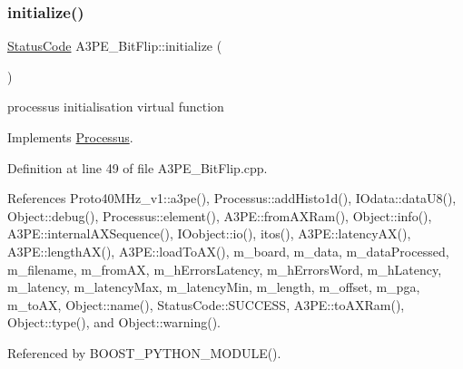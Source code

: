 \subsubsection{\texorpdfstring{initialize()}{initialize()}}
{\footnotesize\ttfamily \hyperlink{classStatusCode}{Status\+Code} A3\+P\+E\+\_\+\+Bit\+Flip\+::initialize (\begin{DoxyParamCaption}{ }\end{DoxyParamCaption})\hspace{0.3cm}{\ttfamily [virtual]}}

processus initialisation virtual function 

Implements \hyperlink{classProcessus_aee88ad7b77ae7319cf8b128e9dd2ea11}{Processus}.



Definition at line 49 of file A3\+P\+E\+\_\+\+Bit\+Flip.\+cpp.



References Proto40\+M\+Hz\+\_\+v1\+::a3pe(), Processus\+::add\+Histo1d(), I\+Odata\+::data\+U8(), Object\+::debug(), Processus\+::element(), A3\+P\+E\+::from\+A\+X\+Ram(), Object\+::info(), A3\+P\+E\+::internal\+A\+X\+Sequence(), I\+Oobject\+::io(), itos(), A3\+P\+E\+::latency\+A\+X(), A3\+P\+E\+::length\+A\+X(), A3\+P\+E\+::load\+To\+A\+X(), m\+\_\+board, m\+\_\+data, m\+\_\+data\+Processed, m\+\_\+filename, m\+\_\+from\+AX, m\+\_\+h\+Errors\+Latency, m\+\_\+h\+Errors\+Word, m\+\_\+h\+Latency, m\+\_\+latency, m\+\_\+latency\+Max, m\+\_\+latency\+Min, m\+\_\+length, m\+\_\+offset, m\+\_\+pga, m\+\_\+to\+AX, Object\+::name(), Status\+Code\+::\+S\+U\+C\+C\+E\+SS, A3\+P\+E\+::to\+A\+X\+Ram(), Object\+::type(), and Object\+::warning().



Referenced by B\+O\+O\+S\+T\+\_\+\+P\+Y\+T\+H\+O\+N\+\_\+\+M\+O\+D\+U\+L\+E().


